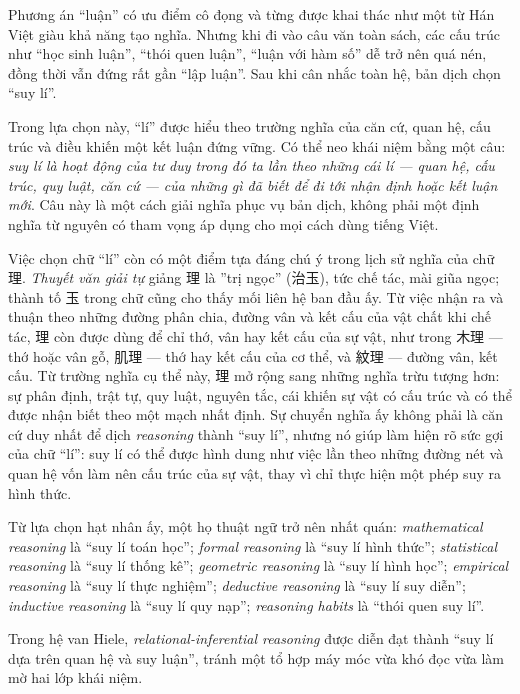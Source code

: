 Phương án ``luận'' có ưu điểm cô đọng và từng được khai thác như một từ Hán Việt giàu khả năng tạo nghĩa. Nhưng khi đi vào câu văn toàn sách, các cấu trúc như ``học sinh luận'', ``thói quen luận'', ``luận với hàm số'' dễ trở nên quá nén, đồng thời vẫn đứng rất gần ``lập luận''. Sau khi cân nhắc toàn hệ, bản dịch chọn ``suy lí''.

Trong lựa chọn này, ``lí'' được hiểu theo trường nghĩa của căn cứ, quan hệ, cấu trúc và điều khiến một kết luận đứng vững. Có thể neo khái niệm bằng một câu: \emph{suy lí là hoạt động của tư duy trong đó ta lần theo những cái lí --- quan hệ, cấu trúc, quy luật, căn cứ --- của những gì đã biết để đi tới nhận định hoặc kết luận mới}. Câu này là một cách giải nghĩa phục vụ bản dịch, không phải một định nghĩa từ nguyên có tham vọng áp dụng cho mọi cách dùng tiếng Việt.

Việc chọn chữ ``lí'' còn có một điểm tựa đáng chú ý trong lịch sử nghĩa của chữ {\hanfont 理}. \emph{Thuyết văn giải tự} giảng {\hanfont 理} là ''trị ngọc'' ({\hanfont 治玉}), tức chế tác, mài giũa ngọc; thành tố {\hanfont 玉} trong chữ cũng cho thấy mối liên hệ ban đầu ấy. Từ việc nhận ra và thuận theo những đường phân chia, đường vân và kết cấu của vật chất khi chế tác, {\hanfont 理} còn được dùng để chỉ thớ, vân hay kết cấu của sự vật, như trong {\hanfont 木理} --- thớ hoặc vân gỗ, {\hanfont 肌理} --- thớ hay kết cấu của cơ thể, và {\hanfont 紋理} --- đường vân, kết cấu. Từ trường nghĩa cụ thể này, {\hanfont 理} mở rộng sang những nghĩa trừu tượng hơn: sự phân định, trật tự, quy luật, nguyên tắc, cái khiến sự vật có cấu trúc và có thể được nhận biết theo một mạch nhất định. Sự chuyển nghĩa ấy không phải là căn cứ duy nhất để dịch \emph{reasoning} thành ``suy lí'', nhưng nó giúp làm hiện rõ sức gợi của chữ ``lí'': suy lí có thể được hình dung như việc lần theo những đường nét và quan hệ vốn làm nên cấu trúc của sự vật, thay vì chỉ thực hiện một phép suy ra hình thức.

Từ lựa chọn hạt nhân ấy, một họ thuật ngữ trở nên nhất quán: \emph{mathematical reasoning} là ``suy lí toán học''; \emph{formal reasoning} là ``suy lí hình thức''; \emph{statistical reasoning} là ``suy lí thống kê''; \emph{geometric reasoning} là ``suy lí hình học''; \emph{empirical reasoning} là ``suy lí thực nghiệm''; \emph{deductive reasoning} là ``suy lí suy diễn''; \emph{inductive reasoning} là ``suy lí quy nạp''; \emph{reasoning habits} là ``thói quen suy lí''.

Trong hệ van Hiele, \emph{relational-inferential reasoning} được diễn đạt thành ``suy lí dựa trên quan hệ và suy luận'', tránh một tổ hợp máy móc vừa khó đọc vừa làm mờ hai lớp khái niệm.

